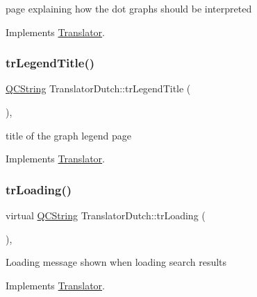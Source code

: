 page explaining how the dot graph\textquotesingle{}s should be interpreted 

Implements \mbox{\hyperlink{class_translator}{Translator}}.

\mbox{\label{class_translator_dutch_abdaaa17f0b13f333da7a5327514799c9}} 
\subsubsection{\texorpdfstring{trLegendTitle()}{trLegendTitle()}}
{\footnotesize\ttfamily \mbox{\hyperlink{class_q_c_string}{Q\+C\+String}} Translator\+Dutch\+::tr\+Legend\+Title (\begin{DoxyParamCaption}{ }\end{DoxyParamCaption})\hspace{0.3cm}{\ttfamily [inline]}, {\ttfamily [virtual]}}

title of the graph legend page 

Implements \mbox{\hyperlink{class_translator}{Translator}}.

\mbox{\label{class_translator_dutch_a7bd89c322b5c702e4807d45c9fdfa946}} 
\subsubsection{\texorpdfstring{trLoading()}{trLoading()}}
{\footnotesize\ttfamily virtual \mbox{\hyperlink{class_q_c_string}{Q\+C\+String}} Translator\+Dutch\+::tr\+Loading (\begin{DoxyParamCaption}{ }\end{DoxyParamCaption})\hspace{0.3cm}{\ttfamily [inline]}, {\ttfamily [virtual]}}

Loading message shown when loading search results 

Implements \mbox{\hyperlink{class_translator}{Translator}}.

\mbox{\label{class_translator_dutch_a29a18dfa81a6aa1484304796168331fc}} 
